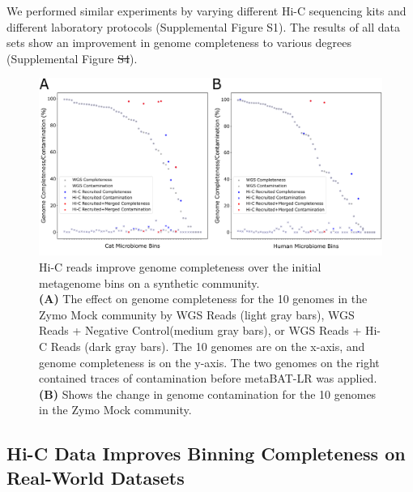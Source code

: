 \documentclass[fleqn,10pt,lineno]{wlpeerj}
\providecommand{\DIFaddtex}[1]{{\protect\color{blue}\uwave{#1}}} %
\providecommand{\DIFdeltex}[1]{{\protect\color{red}\sout{#1}}}                      %
\providecommand{\DIFaddbegin}{} %
\providecommand{\DIFaddend}{} %
\providecommand{\DIFdelbegin}{} %
\providecommand{\DIFdelend}{} %
\providecommand{\DIFadd}[1]{\texorpdfstring{\DIFaddtex{#1}}{#1}} %
\providecommand{\DIFdel}[1]{\texorpdfstring{\DIFdeltex{#1}}{}} %
\newcommand{\DIFscaledelfig}{0.5}
\newlength{\DIFdelgraphicswidth} %
\newlength{\DIFdelgraphicsheight} %
\newcommand{\DIFaddincludegraphics}[2][]{{\color{blue}\fbox{\DIFOincludegraphics[#1]{#2}}}} %
\newcommand{\DIFdelincludegraphics}[2][]{%
\sbox{\DIFdelgraphicsbox}{\DIFOincludegraphics[#1]{#2}}%
\settoboxwidth{\DIFdelgraphicswidth}{\DIFdelgraphicsbox} %
\settoboxtotalheight{\DIFdelgraphicsheight}{\DIFdelgraphicsbox} %
\scalebox{\DIFscaledelfig}{%
\parbox[b]{\DIFdelgraphicswidth}{\usebox{\DIFdelgraphicsbox}\\[-\baselineskip] \rule{\DIFdelgraphicswidth}{0em}}\llap{\resizebox{\DIFdelgraphicswidth}{\DIFdelgraphicsheight}{%
\setlength{\unitlength}{\DIFdelgraphicswidth}%
\begin{picture}(1,1)%
\thicklines\linethickness{2pt} %
{\color[rgb]{1,0,0}\put(0,0){\framebox(1,1){}}}%
{\color[rgb]{1,0,0}\put(0,0){\line( 1,1){1}}}%
{\color[rgb]{1,0,0}\put(0,1){\line(1,-1){1}}}%
\end{picture}%
}\hspace*{3pt}}} %
} %
\DeclareRobustCommand{\DIFaddbegin}{\DIFOaddbegin \let\includegraphics\DIFaddincludegraphics} %
\DeclareRobustCommand{\DIFaddend}{\DIFOaddend \let\includegraphics\DIFOincludegraphics} %
\DeclareRobustCommand{\DIFdelbegin}{\DIFOdelbegin \let\includegraphics\DIFdelincludegraphics} %
\DeclareRobustCommand{\DIFdelend}{\DIFOaddend \let\includegraphics\DIFOincludegraphics} %
\begin{document}
We performed similar experiments by varying different Hi-C sequencing kits and different laboratory protocols (Supplemental Figure S1). The results of all data sets show an improvement in genome completeness to various degrees (Supplemental Figure \DIFdelbegin \DIFdel{S4}\DIFdelend \DIFaddbegin \DIFadd{S5}\DIFaddend ). 

  
\begin{figure}[ht!]
\centering
\includegraphics[scale=0.7]{Fig3.pdf}
\caption{Hi-C reads improve genome completeness over the initial metagenome bins on a synthetic community.
    \\\textbf{(A)} The effect on genome completeness for the 10 genomes in the Zymo Mock community by WGS Reads (light gray bars), WGS Reads + Negative Control(medium gray bars), or WGS Reads + Hi-C Reads (dark gray bars). The 10 genomes are on the x-axis, and genome completeness is on the y-axis. The two genomes on the right contained traces of contamination before metaBAT-LR was applied. \textbf{(B)} Shows the change in genome contamination for the 10 genomes in the Zymo Mock community.}
\label{fig:synthetic}
\end{figure}


\subsection*{Hi-C Data Improves Binning Completeness on Real-World Datasets}
\end{document}
